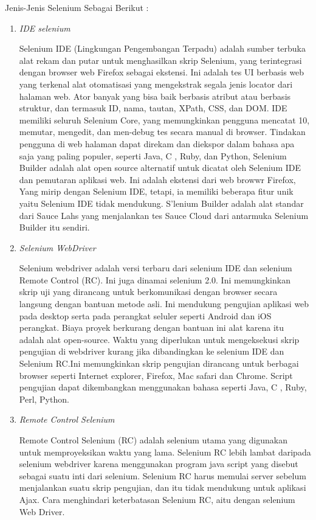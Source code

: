 Jenis-Jenis Selenium Sebagai Berikut :

\begin{enumerate}

\item \textit{IDE selenium}
\par Selenium IDE (Lingkungan Pengembangan Terpadu) adalah sumber terbuka alat rekam dan putar untuk menghasilkan skrip Selenium, yang terintegrasi dengan browser web Firefox sebagai ekstensi. Ini adalah tes UI berbasis web yang terkenal alat otomatisasi yang mengekstrak segala jenis locator dari halaman web. Ator banyak yang bisa baik berbasis atribut atau berbasis struktur, dan termasuk ID, nama, tautan, XPath, CSS, dan DOM. IDE memiliki seluruh Selenium Core, yang memungkinkan pengguna mencatat 10, memutar, mengedit, dan men-debug tes secara manual di browser. Tindakan pengguna di web halaman dapat direkam dan diekspor dalam bahasa apa saja yang paling populer, seperti Java, C , Ruby, dan Python, Selenium Builder adalah alat open source alternatif untuk dicatat oleh Selenium IDE dan pemutaran aplikasi web. Ini adalah ekstensi dari web browwr Firefox, Yang mirip dengan Selenium IDE, tetapi, ia memiliki beberapa fitur unik yaitu Selenium IDE tidak mendukung. S'lenium Builder adalah alat standar dari Sauce Lahs yang menjalankan tes Sauce Cloud dari antarmuka Selenium Builder itu sendiri.

\item \textit{Selenium WebDriver}
\par Selenium webdriver adalah versi terbaru dari selenium IDE dan selenium Remote Control (RC). Ini juga dinamai selenium 2.0. Ini memungkinkan skrip uji yang dirancang untuk berkomunikasi dengan browser secara langsung dengan bantuan metode asli. Ini mendukung pengujian aplikasi web pada desktop serta pada perangkat seluler seperti Android dan iOS
perangkat. Biaya proyek berkurang dengan bantuan ini alat karena itu adalah alat open-source. Waktu yang diperlukan untuk mengeksekusi skrip pengujian di webdriver kurang jika dibandingkan ke selenium IDE dan Selenium RC.Ini memungkinkan skrip pengujian dirancang untuk berbagai browser seperti Internet explorer, Firefox, Mac safari dan Chrome. Script pengujian dapat dikembangkan menggunakan bahasa seperti Java, C , Ruby, Perl, Python.


\item \textit{Remote Control Selenium}
\par Remote Control Selenium (RC) adalah selenium utama yang digunakan untuk memproyeksikan waktu yang lama. Selenium RC lebih lambat daripada selenium webdriver karena menggunakan program java script yang disebut sebagai suatu inti dari selenium. Selenium RC harus memulai server sebelum menjalankan suatu skrip pengujian, dan itu tidak mendukung untuk aplikasi Ajax. Cara menghindari keterbatasan Selenium RC, aitu dengan selenium Web Driver.


\end{enumerate}
